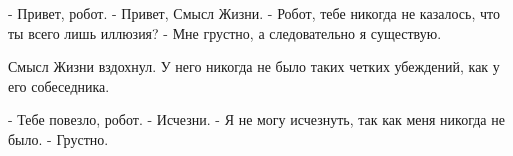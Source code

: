 - Привет, робот.
- Привет, Смысл Жизни.
- Робот, тебе никогда не казалось, что ты всего лишь иллюзия?
- Мне грустно, а следовательно я существую.

Смысл Жизни вздохнул. У него никогда не было таких четких убеждений, как у его собеседника.

- Тебе повезло, робот.
- Исчезни.
- Я не могу исчезнуть, так как меня никогда не было.
- Грустно.